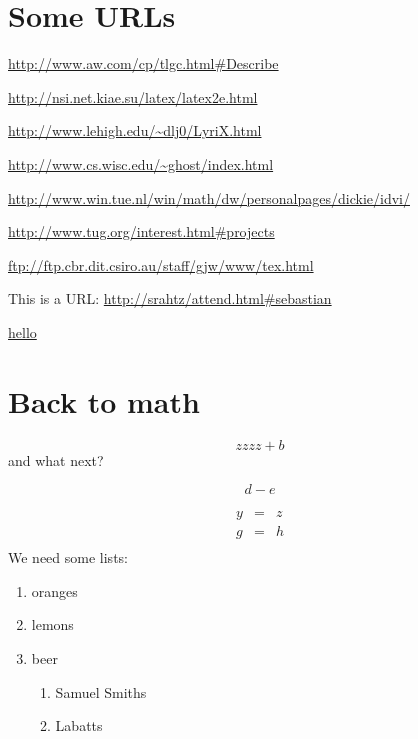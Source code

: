 \documentclass[11pt]{book}
\begin{document}
\section{Some URLs}

\begin{minipage}{1.5in}
\url{http://www.aw.com/cp/tlgc.html#Describe}

\url{http://nsi.net.kiae.su/latex/latex2e.html}

\url{http://www.lehigh.edu/~dlj0/LyriX.html}

\url{http://www.cs.wisc.edu/~ghost/index.html}

\url{http://www.win.tue.nl/win/math/dw/personalpages/dickie/idvi/}

\url{http://www.tug.org/interest.html#projects}

\url{ftp://ftp.cbr.dit.csiro.au/staff/gjw/www/tex.html}


This is a URL: \url{http://srahtz/attend.html#sebastian}

\hyperref{file:test2.pdf}{equation}{1}{hello}
\end{minipage}

\newpage

\section{Back to math}
\begin{equation}
  zzzz + b
  \label{eq1}
\end{equation}
and what next?

\begin{equation}
  d - e
  \label{eq2}
\end{equation}

\begin{eqnarray}
  y &=&z\\
  g &=&h\\
  \label{eq3}
\end{eqnarray}
We need some lists:
\begin{enumerate}
\item oranges
\item lemons
\item beer
  \begin{enumerate}
  \item Samuel Smiths
  \item Labatts
  \end{enumerate}
\end{enumerate}
\end{document}
